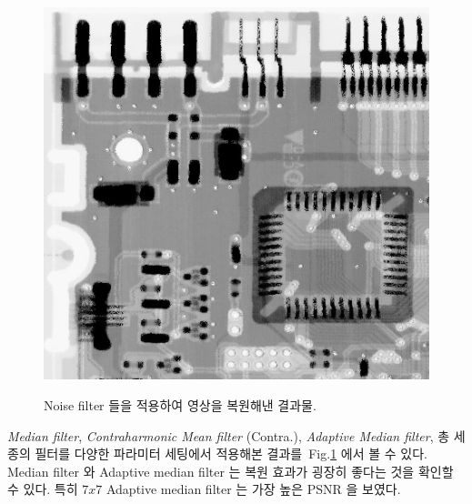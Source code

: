 \documentclass[a4paper, 12p]{paper}
\begin{document}
\begin{figure}[H]
{\includegraphics[scale=0.22]{../data/apaptive_7.png}
}
\caption{Noise filter 들을 적용하여 영상을 복원해낸 결과물.}\label{fig:filtered}
\end{figure}

\textit{Median filter}, \textit{Contraharmonic Mean filter} (Contra.), \textit{Adaptive Median filter}, 총 세종의 필터를 다양한 파라미터 세팅에서 적용해본 결과를~Fig.\ref{fig:filtered} 에서 볼 수 있다. Median filter 와 Adaptive median filter 는 복원 효과가 굉장히 좋다는 것을 확인할 수 있다. 특히 $7x7$ Adaptive median filter 는 가장 높은 PSNR 을 보였다.
\end{document}
